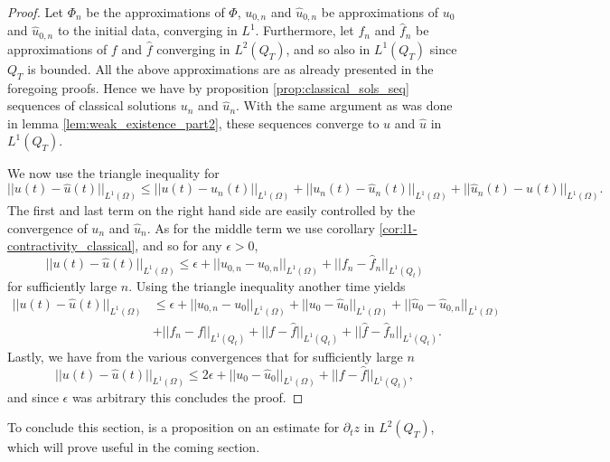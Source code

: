 \documentclass[11pt, a4paper]{article}
\begin{document}
\begin{proof}
Let $\Phi_n$ be the approximations of $\Phi$, $u_{0,n}$ and $\hat{u}_{0,n}$ be approximations of $u_0$ and $\hat{u}_{0,n}$ to the initial data, converging in $L^1$. Furthermore, let $f_n$ and $\hat{f}_n$ be approximations of $f$ and $\hat{f}$ converging in $L^2(Q_T)$, and so also in $L^1(Q_T)$ since $Q_T$ is bounded. All the above approximations are as already presented in the foregoing proofs. Hence we have by proposition \ref{prop:classical_sols_seq} sequences of classical solutions $u_n$ and $\hat{u}_n$. With the same argument as was done in lemma \ref{lem:weak_existence_part2}, these sequences converge to $u$ and $\hat{u}$ in $L^1(Q_T)$.

We now use the triangle inequality for
\begin{equation*}
||u(t) - \hat{u}(t)||_{L^1(\Omega)} \leq ||u(t) - u_n(t)||_{L^1(\Omega)} + ||u_n(t) - \hat{u}_n(t)||_{L^1(\Omega)} + ||\hat{u}_n(t) - \hat{u}(t)||_{L^1(\Omega)}.
\end{equation*}
The first and last term on the right hand side are easily controlled by the convergence of $u_n$ and $\hat{u}_n$. As for the middle term we use corollary \ref{cor:l1-contractivity_classical}, and so for any $\epsilon > 0$,
\begin{equation*}
||u(t) - \hat{u}(t)||_{L^1(\Omega)} \leq \epsilon + ||u_{0,n} - \hat{u}_{0,n}||_{L^1(\Omega)} + ||f_n - \hat{f}_n||_{L^1(Q_t)}
\end{equation*}
for sufficiently large $n$.
Using the triangle inequality another time yields
\begin{align*}
||u(t) - \hat{u}(t)||_{L^1(\Omega)} &\leq \epsilon + ||u_{0,n} - u_0||_{L^1(\Omega)} + ||u_0 - \hat{u}_0||_{L^1(\Omega)} + ||\hat{u}_0 -\hat{u}_{0,n}||_{L^1(\Omega)} \\
&+ ||f_n - f||_{L^1(Q_t)} + ||f - \hat{f}||_{L^1(Q_t)} + ||\hat{f}-\hat{f}_n||_{L^1(Q_t)}.
\end{align*}
Lastly, we have from the various convergences that for sufficiently large $n$  
\begin{equation*}
||u(t) - \hat{u}(t)||_{L^1(\Omega)} \leq 2\epsilon + ||u_0 - \hat{u}_0||_{L^1(\Omega)} + ||f - \hat{f}||_{L^1(Q_t)}, 
\end{equation*}
and since $\epsilon$ was arbitrary this concludes the proof.
\end{proof}

To conclude this section, is a proposition on an estimate for $\partial_t z$ in $L^2(Q_T)$, which will prove useful in the coming section.
\end{document}
